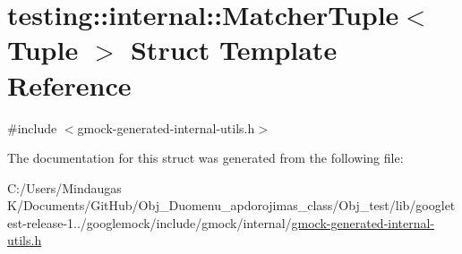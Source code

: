\hypertarget{structtesting_1_1internal_1_1_matcher_tuple}{}\section{testing\+::internal\+::Matcher\+Tuple$<$ Tuple $>$ Struct Template Reference}
\label{structtesting_1_1internal_1_1_matcher_tuple}


{\ttfamily \#include $<$gmock-\/generated-\/internal-\/utils.\+h$>$}



The documentation for this struct was generated from the following file\+:\begin{DoxyCompactItemize}
\item 
C\+:/\+Users/\+Mindaugas K/\+Documents/\+Git\+Hub/\+Obj\+\_\+\+Duomenu\+\_\+apdorojimas\+\_\+class/\+Obj\+\_\+test/lib/googletest-\/release-\/1../googlemock/include/gmock/internal/\mbox{\hyperlink{gmock-generated-internal-utils_8h}{gmock-\/generated-\/internal-\/utils.\+h}}\end{DoxyCompactItemize}
